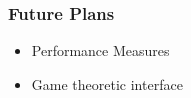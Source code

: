 \begin{frame}
    \frametitle{Future Plans}

    \begin{itemize}
        \item Performance Measures
        \item Game theoretic interface
    \end{itemize}

\end{frame}